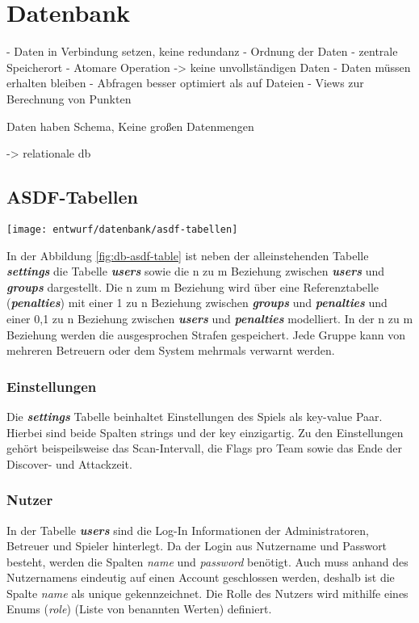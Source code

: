 \section{Datenbank}
- Daten in Verbindung setzen, keine redundanz
- Ordnung der Daten
- zentrale Speicherort
- Atomare Operation -> keine unvollständigen Daten
- Daten müssen erhalten bleiben
- Abfragen besser optimiert als auf Dateien
- Views zur Berechnung von Punkten

Daten haben Schema, Keine großen Datenmengen

-> relationale db

\subsection{ASDF-Tabellen}
\begin{center}
	\texttt{[image: entwurf/datenbank/asdf-tabellen]}
	\label{fig:db-asdf-table}
\end{center}

In der Abbildung \ref{fig:db-asdf-table} ist neben der alleinstehenden Tabelle \textbf{\textit{settings}} die Tabelle \textbf{\textit{users}} sowie die n zu m Beziehung zwischen \textbf{\textit{users}} und \textbf{\textit{groups}} dargestellt. Die n zum m Beziehung wird über eine Referenztabelle (\textbf{\textit{penalties}}) mit einer 1 zu n Beziehung zwischen \textbf{\textit{groups}} und \textbf{\textit{penalties}} und einer 0,1 zu n Beziehung zwischen \textbf{\textit{users}} und \textbf{\textit{penalties}} modelliert. In der n zu m Beziehung werden die ausgesprochen Strafen gespeichert. Jede Gruppe kann von mehreren Betreuern oder dem System mehrmals verwarnt werden.

\subsubsection{Einstellungen}
Die \textbf{\textit{settings}} Tabelle beinhaltet Einstellungen des Spiels als key-value Paar. Hierbei sind beide Spalten strings und der key einzigartig. Zu den Einstellungen gehört beispeilsweise das Scan-Intervall, die Flags pro Team sowie das Ende der Discover- und Attackzeit.

\subsubsection{Nutzer}
In der Tabelle \textbf{\textit{users}} sind die Log-In Informationen der Administratoren, Betreuer und Spieler hinterlegt. Da der Login aus Nutzername und Passwort besteht, werden die Spalten \textit{name} und \textit{password} benötigt. Auch muss anhand des Nutzernamens eindeutig auf einen Account geschlossen werden, deshalb ist die Spalte \textit{name} als unique gekennzeichnet. Die Rolle des Nutzers wird mithilfe eines Enums (\textit{role}) (Liste von benannten Werten) definiert.

